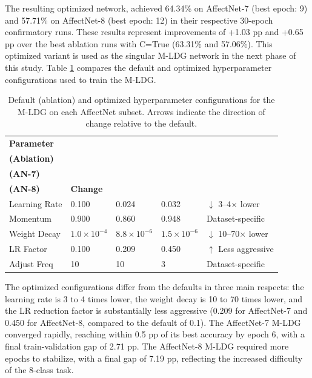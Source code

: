 The resulting optimized network, achieved 64.34\% on AffectNet-7 (best epoch: 9) and 57.71\% on AffectNet-8 (best epoch: 12) in their respective 30-epoch confirmatory runs. These results represent improvements of +1.03 pp and +0.65 pp over the best ablation runs with C=True (63.31\% and 57.06\%). This optimized variant is used as the singular M-LDG network in the next phase of this study. Table \ref{tab:results-p1-hyperparams} compares the default and optimized hyperparameter configurations used to train the M-LDG.\\

\begin{table}[h!]
    \centering
    \begin{tabular}{@{}lllll@{}}
    \toprule
    \textbf{Parameter} & \shortstack{\textbf{Default}\\\textbf{(Ablation)}} & \shortstack{\textbf{Optimized}\\\textbf{(AN-7)}} & \shortstack{\textbf{Optimized}\\\textbf{(AN-8)}} & \textbf{Change} \\
    \midrule
    Learning Rate  & 0.100                       & 0.024                     & 0.032                     & $\downarrow$ 3--4$\times$ lower \\
    Momentum       & 0.900                       & 0.860                     & 0.948                     & Dataset-specific \\
    Weight Decay   & $1.0\times10^{-4}$          & $8.8\times10^{-6}$        & $1.5\times10^{-6}$        & $\downarrow$ 10--70$\times$ lower \\
    LR Factor      & 0.100                       & 0.209                     & 0.450                     & $\uparrow$ Less aggressive \\
    Adjust Freq    & 10                          & 10                        & 3                         & Dataset-specific \\
    \bottomrule
    \end{tabular}
    \caption[Phase I default vs. optimized hyperparameters]{Default (ablation) and optimized hyperparameter configurations for the M-LDG on each AffectNet subset. Arrows indicate the direction of change relative to the default.}
    \label{tab:results-p1-hyperparams}
\end{table}

The optimized configurations differ from the defaults in three main respects: the learning rate is 3 to 4 times lower, the weight decay is 10 to 70 times lower, and the LR reduction factor is substantially less aggressive (0.209 for AffectNet-7 and 0.450 for AffectNet-8, compared to the default of 0.1). The AffectNet-7 M-LDG converged rapidly, reaching within 0.5 pp of its best accuracy by epoch 6, with a final train-validation gap of 2.71 pp. The AffectNet-8 M-LDG required more epochs to stabilize, with a final gap of 7.19 pp, reflecting the increased difficulty of the 8-class task.

